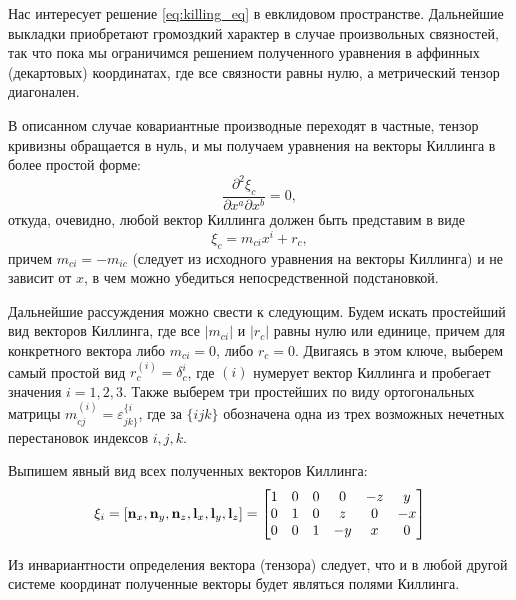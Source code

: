 \documentclass[12pt,a4paper]{article}
\begin{document}
        Нас интересует решение \autoref{eq:killing_eq} в евклидовом пространстве. Дальнейшие выкладки приобретают громоздкий характер в случае произвольных связностей, так что пока мы ограничимся решением полученного уравнения в аффинных (декартовых) координатах, где все связности равны нулю, а метрический тензор диагонален.

        В описанном случае ковариантные производные переходят в частные, тензор кривизны обращается в нуль, и мы получаем уравнения на векторы Киллинга в более простой форме:
        \begin{equation}
            \frac{\partial^2 \xi_c}{\partial x^a \partial x^b} = 0,
        \end{equation}
        откуда, очевидно, любой вектор Киллинга должен быть представим в виде
        \begin{equation}
            \xi_c = m_{ci} x^i + r_c,
        \end{equation}
        причем $m_{ci} = - m_{ic}$ (следует из исходного уравнения на векторы Киллинга) и не зависит от $x$, в чем можно убедиться непосредственной подстановкой.

        Дальнейшие рассуждения можно свести к следующим. Будем искать простейший вид векторов Киллинга, где все $|m_{ci}|$ и $|r_c|$ равны нулю или единице, причем для конкретного вектора либо $m_{ci} = 0$, либо $r_c = 0$. Двигаясь в этом ключе, выберем самый простой вид $r^{(i)}_c = \delta^i_c$, где $(i)$ нумерует вектор Киллинга и пробегает значения $i = 1,2,3$. Также выберем три простейших по виду ортогональных матрицы $m^{(i)}_{cj} = \varepsilon^{\{i}_{jk\}}$, где за $\{ijk\}$ обозначена одна из трех возможных нечетных перестановок индексов $i,j,k$.

        Выпишем явный вид всех полученных векторов Киллинга:
        \begin{equation}
            \mathbf{\xi}_i
            =
            \left[
                \mathbf{n}_x, \mathbf{n}_y, \mathbf{n}_z,
                \mathbf{l}_x, \mathbf{l}_y, \mathbf{l}_z
            \right]
            =
            \begin{bmatrix}
                1 & 0 & 0 & 0  & -z & y  \\
                0 & 1 & 0 & z  & 0  & -x \\
                0 & 0 & 1 & -y & x  & 0
            \end{bmatrix}
        \end{equation}

        Из инвариантности определения вектора (тензора) следует, что и в любой другой системе координат полученные векторы будет являться полями Киллинга.
\end{document}
